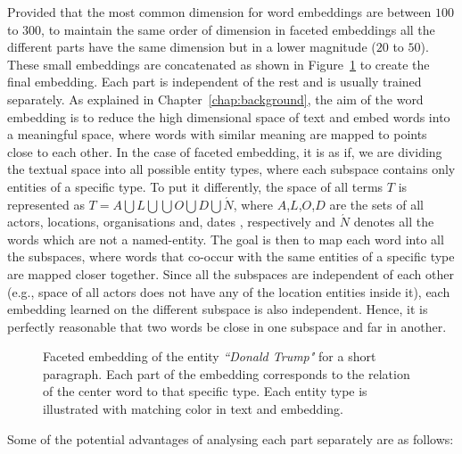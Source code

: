 Provided that the most common dimension for word embeddings are between $100$ to $300$, to maintain the same order of dimension in faceted embeddings all the different parts have the same dimension but in a lower magnitude ($20$ to $50$). These small embeddings are concatenated as shown in Figure~\ref{fig:faceted_emb} to create the final embedding. Each part is independent of the rest and is usually trained separately. As explained in Chapter~\ref{chap:background}, the aim of the word embedding is to reduce the high dimensional space of text and embed words into a meaningful space, where words with similar meaning are mapped to points close to each other. In the case of faceted embedding, it is as if, we are dividing the textual space into all possible entity types, where each subspace contains only entities of a specific type. To put it differently, the space of all terms $T$ is represented as $T=A\bigcup  L\bigcup  \bigcup  O\bigcup  D\bigcup  \acute {N} $, where $A$,$L$,$O$,$D$ are the sets of all actors, locations, organisations and, dates , respectively and $ \acute {N }$ denotes all the words which are not a named-entity. The goal is then to map each word into all the subspaces, where words that co-occur with the same entities of a specific type are mapped closer together. Since all the subspaces are independent of each other (e.g., space of all actors does not have any of the location entities inside it), each embedding learned on the different subspace is also independent. Hence, it is perfectly reasonable that two words be close in one subspace and far in another. 
\begin{figure}
\centering 
\resizebox{0.97\textwidth}{0.3\textwidth}{      

}
\caption{Faceted embedding of the entity \emph{``Donald Trump"} for a short paragraph. Each part of the embedding corresponds to the relation of the center word to that specific type. Each entity type is illustrated with matching color in text and embedding. }
\label{fig:faceted_emb}
\end{figure} 
Some of the potential advantages of analysing each part separately are as follows: \\

